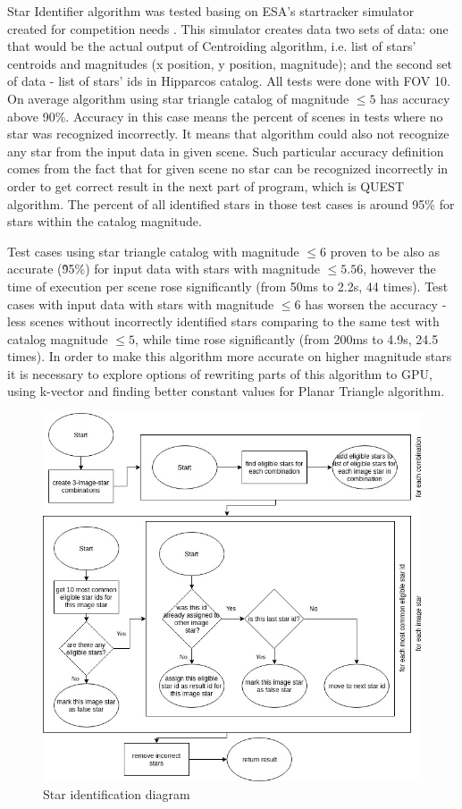 \documentclass[12pt,a4paper,oneside]{article}
\begin{document}
Star Identifier algorithm was tested basing on ESA's startracker simulator created for competition needs \cite{esa-competition}. This simulator creates data two sets of data: one that would be the actual output of Centroiding algorithm, i.e. list of stars' centroids and magnitudes (x position, y position, magnitude); and the second set of data - list of stars' ids in Hipparcos catalog.
All tests were done with FOV 10\degree . On average algorithm using star triangle catalog of magnitude $\leqslant 5$ has accuracy above 90\%. Accuracy in this case means the percent of scenes in tests where no star was recognized incorrectly. It means that algorithm could also not recognize any star from the input data in given scene.
Such particular accuracy definition comes from the fact that for given scene no star can be recognized incorrectly in order to get correct result in the next part of program, which is QUEST algorithm. The percent of all identified stars in those test cases is around 95\% for stars within the catalog magnitude.

Test cases using star triangle catalog with magnitude $\leqslant 6$ proven to be also as accurate (\~95\%) for input data with stars with magnitude $\leqslant 5.56$, however the time of execution per scene rose significantly (from 50ms to 2.2s, 44 times). Test cases with input data with stars with magnitude $\leqslant 6$ has worsen the accuracy - less scenes without incorrectly identified stars comparing to the same test with catalog magnitude $\leqslant 5$, while time rose significantly (from 200ms to 4.9s, 24.5 times). In order to make this algorithm more accurate on higher magnitude stars it is necessary to explore options of rewriting parts of this algorithm to GPU, using k-vector and finding better constant values for Planar Triangle algorithm.


\begin{figure}[!htbp]
\includegraphics[scale=0.55]{star_identifier_diagram.jpg}
\centering
\caption{Star identification diagram}
\label{fig:startracker_diagram}
\end{figure}
\end{document}
